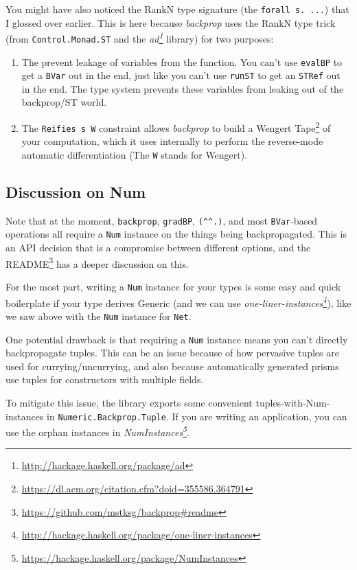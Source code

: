 \documentclass[]{article}
\renewcommand{\href}[2]{#2\footnote{\url{#1}}}
\begin{document}
You might have also noticed the RankN type signature (the
\texttt{forall\ s.\ ...}) that I glossed over earlier. This is here because
\emph{backprop} uses the RankN type trick (from \texttt{Control.Monad.ST} and
the \emph{\href{http://hackage.haskell.org/package/ad}{ad}} library) for two
purposes:

\begin{enumerate}
\def\labelenumi{\arabic{enumi}.}
\tightlist
\item
  The prevent leakage of variables from the function. You can't use
  \texttt{evalBP} to get a \texttt{BVar} out in the end, just like you can't use
  \texttt{runST} to get an \texttt{STRef} out in the end. The type system
  prevents these variables from leaking out of the backprop/ST world.
\item
  The \texttt{Reifies\ s\ W} constraint allows \emph{backprop} to build a
  \href{https://dl.acm.org/citation.cfm?doid=355586.364791}{Wengert Tape} of
  your computation, which it uses internally to perform the reverse-mode
  automatic differentiation (The \texttt{W} stands for Wengert).
\end{enumerate}

\hypertarget{discussion-on-num}{%
\subsection{Discussion on Num}\label{discussion-on-num}}

Note that at the moment, \texttt{backprop}, \texttt{gradBP},
\texttt{(\^{}\^{}.)}, and most \texttt{BVar}-based operations all require a
\texttt{Num} instance on the things being backpropagated. This is an API
decision that is a compromise between different options, and the
\href{https://github.com/mstksg/backprop\#readme}{README} has a deeper
discussion on this.

For the most part, writing a \texttt{Num} instance for your types is some easy
and quick boilerplate if your type derives Generic (and we can use
\emph{\href{http://hackage.haskell.org/package/one-liner-instances}{one-liner-instances}}),
like we saw above with the \texttt{Num} instance for \texttt{Net}.

One potential drawback is that requiring a \texttt{Num} instance means you can't
directly backpropagate tuples. This can be an issue because of how pervasive
tuples are used for currying/uncurrying, and also because automatically
generated prisms use tuples for constructors with multiple fields.

To mitigate this issue, the library exports some convenient
tuples-with-Num-instances in \texttt{Numeric.Backprop.Tuple}. If you are writing
an application, you can use the orphan instances in
\emph{\href{https://hackage.haskell.org/package/NumInstances}{NumInstances}}.
\end{document}
